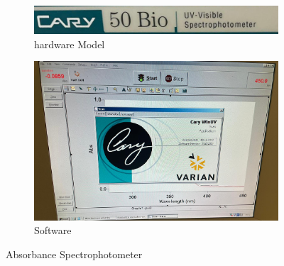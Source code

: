 \documentclass[a4paper,english,12pt,bibliography=totoc]{scrreprt}
\begin{document}
\begin{figure}[H]
    \centering
    \begin{subfigure}[b]{0.45\textwidth}
        \centering
        \includegraphics[width=\textwidth]{Instruments/Spectruophotometer.png} 
        \caption{hardware Model}
        \label{fig:subfigure1}
    \end{subfigure}
    \hfill
    \begin{subfigure}[b]{0.45\textwidth}
        \centering
        \includegraphics[width=\textwidth]{Instruments/software for absorption.png} %
        \caption{Software}
        \label{fig:subfigure2}
    \end{subfigure}
    \caption{Absorbance Spectrophotometer}
    \label{fig:mainfigure}
\end{figure}
\end{document}
